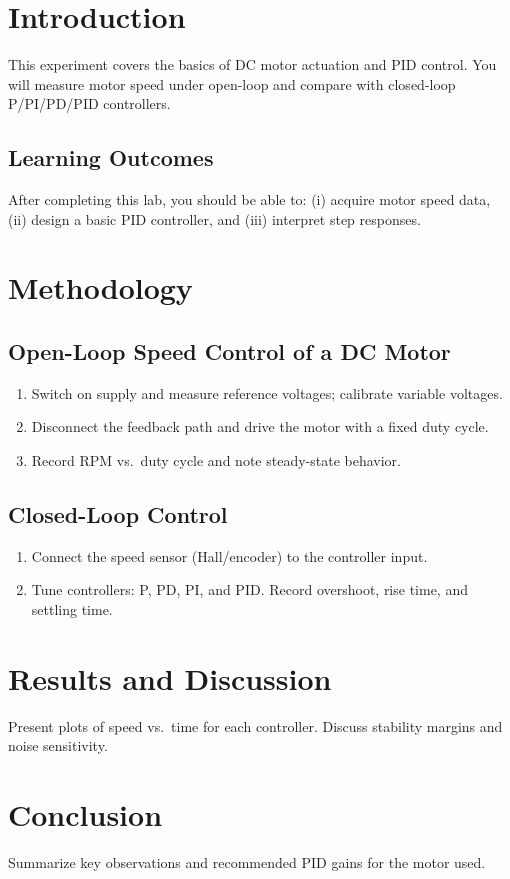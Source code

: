 \documentclass[11pt,twoside]{SEEELab_V1}
\begin{document}
\makelabtitle

\makemargintoc

\section{Introduction}
This experiment covers the basics of DC motor actuation and PID control. You will measure motor speed under open-loop and compare with closed-loop P/PI/PD/PID controllers.

\subsection{Learning Outcomes}
After completing this lab, you should be able to: (i) acquire motor speed data, (ii) design a basic PID controller, and (iii) interpret step responses.

\section{Methodology}
\subsection{Open-Loop Speed Control of a DC Motor}
\begin{enumerate}
  \item Switch on supply and measure reference voltages; calibrate variable voltages.
  \item Disconnect the feedback path and drive the motor with a fixed duty cycle.
  \item Record RPM vs.\ duty cycle and note steady-state behavior.
\end{enumerate}

\subsection{Closed-Loop Control}
\begin{enumerate}
  \item Connect the speed sensor (Hall/encoder) to the controller input.
  \item Tune controllers: P, PD, PI, and PID. Record overshoot, rise time, and settling time.
\end{enumerate}

\section{Results and Discussion}
Present plots of speed vs.\ time for each controller. Discuss stability margins and noise sensitivity.

\section{Conclusion}
Summarize key observations and recommended PID gains for the motor used.
\end{document}
